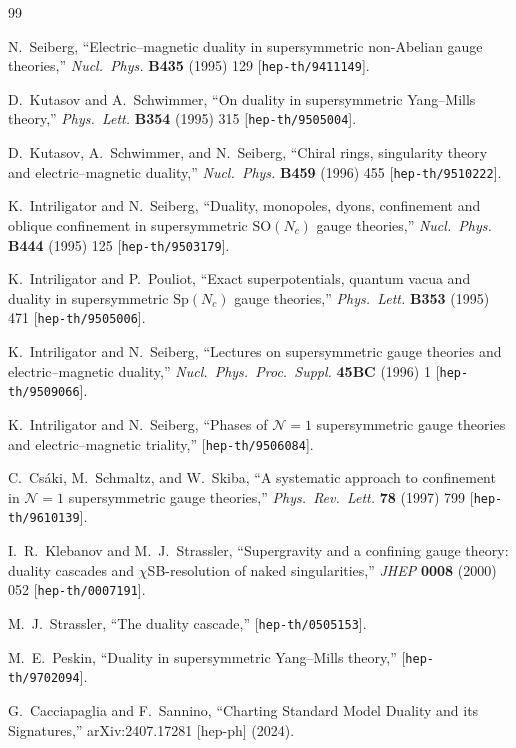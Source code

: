 \documentclass[11pt,a4paper]{article}
\begin{document}
\begin{thebibliography}{99}

  N.~Seiberg,
  ``Electric--magnetic duality in supersymmetric non-Abelian gauge
  theories,''
  \textit{Nucl.\ Phys.} \textbf{B435} (1995) 129
  [\texttt{hep-th/9411149}].

  D.~Kutasov and A.~Schwimmer,
  ``On duality in supersymmetric Yang--Mills theory,''
  \textit{Phys.\ Lett.} \textbf{B354} (1995) 315
  [\texttt{hep-th/9505004}].

  D.~Kutasov, A.~Schwimmer, and N.~Seiberg,
  ``Chiral rings, singularity theory and electric--magnetic duality,''
  \textit{Nucl.\ Phys.} \textbf{B459} (1996) 455
  [\texttt{hep-th/9510222}].

  K.~Intriligator and N.~Seiberg,
  ``Duality, monopoles, dyons, confinement and oblique confinement
  in supersymmetric $\mathrm{SO}(N_c)$ gauge theories,''
  \textit{Nucl.\ Phys.} \textbf{B444} (1995) 125
  [\texttt{hep-th/9503179}].

  K.~Intriligator and P.~Pouliot,
  ``Exact superpotentials, quantum vacua and duality in supersymmetric
  $\mathrm{Sp}(N_c)$ gauge theories,''
  \textit{Phys.\ Lett.} \textbf{B353} (1995) 471
  [\texttt{hep-th/9505006}].

  K.~Intriligator and N.~Seiberg,
  ``Lectures on supersymmetric gauge theories and electric--magnetic
  duality,''
  \textit{Nucl.\ Phys.\ Proc.\ Suppl.} \textbf{45BC} (1996) 1
  [\texttt{hep-th/9509066}].

  K.~Intriligator and N.~Seiberg,
  ``Phases of $\mathcal{N}=1$ supersymmetric gauge theories and
  electric--magnetic triality,''
  [\texttt{hep-th/9506084}].

  C.~Cs\'aki, M.~Schmaltz, and W.~Skiba,
  ``A systematic approach to confinement in $\mathcal{N}=1$
  supersymmetric gauge theories,''
  \textit{Phys.\ Rev.\ Lett.} \textbf{78} (1997) 799
  [\texttt{hep-th/9610139}].

  I.~R.~Klebanov and M.~J.~Strassler,
  ``Supergravity and a confining gauge theory: duality cascades
  and $\chi$SB-resolution of naked singularities,''
  \textit{JHEP} \textbf{0008} (2000) 052
  [\texttt{hep-th/0007191}].

  M.~J.~Strassler,
  ``The duality cascade,''
  [\texttt{hep-th/0505153}].

  M.~E.~Peskin,
  ``Duality in supersymmetric Yang--Mills theory,''
  [\texttt{hep-th/9702094}].

  G.~Cacciapaglia and F.~Sannino,
  ``Charting Standard Model Duality and its Signatures,''
  arXiv:2407.17281 [hep-ph] (2024).

\end{thebibliography}
\end{document}
